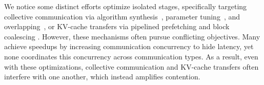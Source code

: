 We notice some distinct efforts optimize isolated stages, specifically targeting collective communication via algorithm synthesis~\cite{shah2023taccl,liu2024rethinking,kim2024tccl,cao2025syccl}, parameter tuning~\cite{xu2025autoccl}, and overlapping~\cite{deepseektech,comet,zheng2025triton,zheng2025tilelink}, or KV-cache transfers via pipelined prefetching \cite{splitwise,mooncakefast} and block coalescing \cite{strati2024d,chen2024kvdirect,li2025flowkv}. However, these mechanisms often pursue conflicting objectives. Many achieve speedups by increasing communication concurrency to hide latency, yet none coordinates this concurrency across communication types. As a result, even with these optimizations, collective communication and KV-cache transfers often interfere with one another, which instead amplifies contention.
